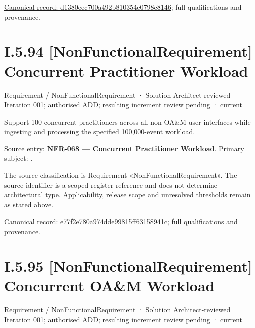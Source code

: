 {\footnotesize \href{../../../../../../../continuum/motivation/requirement/non-functional-requirement/d1380eec700a492b810354e0798c8146.md}{Canonical record: d1380eec700a492b810354e0798c8146}; full qualifications and provenance.}\par
\section*{I.5.94 [NonFunctionalRequirement] Concurrent Practitioner Workload}
\label{navigation:I.5.94}

\label{element:e77f2e780a974dde99815ff63158941c}
{\small Requirement / NonFunctionalRequirement · Solution Architect-reviewed Iteration 001; authorised ADD; resulting increment review pending · current}\par

Support 100 concurrent practitioners across all non-OA\&M user interfaces while ingesting and processing the specified 100,000-event workload.



Source entry: \textbf{NFR-068 — Concurrent Practitioner Workload}. Primary subject: \texttt{}.



The source classification is Requirement «NonFunctionalRequirement». The source identifier is a scoped register reference and does not determine architectural type. Applicability, release scope and unresolved thresholds remain as stated above.


{\footnotesize \href{../../../../../../../continuum/motivation/requirement/non-functional-requirement/e77f2e780a974dde99815ff63158941c.md}{Canonical record: e77f2e780a974dde99815ff63158941c}; full qualifications and provenance.}\par
\section*{I.5.95 [NonFunctionalRequirement] Concurrent OA\&M Workload}
\label{navigation:I.5.95}

\label{element:5220295ae5d144468066ae70683e0f19}
{\small Requirement / NonFunctionalRequirement · Solution Architect-reviewed Iteration 001; authorised ADD; resulting increment review pending · current}\par


